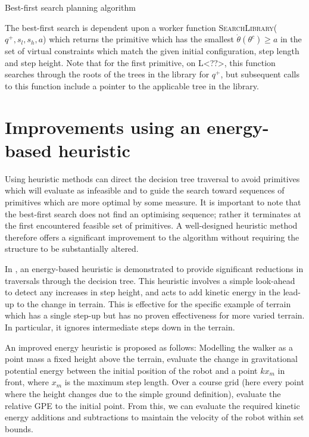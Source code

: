 \begin{algorithm}
	\begin{algorithmic}[1]
		\EndFunction
		\EndFunction
	\end{algorithmic}
	\caption{Best-first search planning algorithm}
	\label{alg:bestfirstsearch}
\end{algorithm}

The best-first search is dependent upon a worker function \textsc{SearchLibrary}($q^+,s_l,s_h,a$) which returns the primitive which has the smallest $\dot{\theta}(\theta^c) \geq a$ in the set of virtual constraints which match the given initial configuration, step length and step height. Note that for the first primitive, on {\color{blue} L<??>}, this function searches through the roots of the trees in the library for $q^+$, but subsequent calls to this function include a pointer to the applicable tree in the library.

\section[Energy-based heuristic]{Improvements using an energy-based heuristic}
Using heuristic methods can direct the decision tree traversal to avoid primitives which will evaluate as infeasible and to guide the search toward sequences of primitives which are more optimal by some measure. It is important to note that the best-first search does not find an optimising sequence; rather it terminates at the first encountered feasible set of primitives. A well-designed heuristic method therefore offers a significant improvement to the algorithm without requiring the structure to be substantially altered.

In \cite{manchester13planning}, an energy-based heuristic is demonstrated to provide significant reductions in traversals through the decision tree. This heuristic involves a simple look-ahead to detect any increases in step height, and acts to add kinetic energy in the lead-up to the change in terrain. This is effective for the specific example of terrain which has a single step-up but has no proven effectiveness for more varied terrain. In particular, it ignores intermediate steps down in the terrain.

An improved energy heuristic is proposed as follows: Modelling the walker as a point mass a fixed height above the terrain, evaluate the change in gravitational potential energy between the initial position of the robot and a point $kx_m$ in front, where $x_m$ is the maximum step length. Over a course grid (here every point where the height changes due to the simple ground definition), evaluate the relative GPE to the initial point. From this, we can evaluate the required kinetic energy additions and subtractions to maintain the velocity of the robot within set bounds.
	
